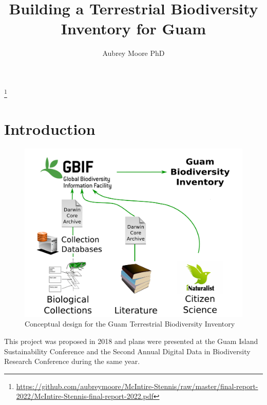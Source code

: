 \documentclass[12pt,letterpaper,english,bibliography=totocnumbered, abstract=on]{scrartcl}
\begin{document}
\titlehead{Final Report: McIntire-Stennis Project GUA0930}

\title{Building a Terrestrial Biodiversity Inventory for Guam}

\author{Aubrey Moore PhD}

\maketitle
\footnote{\url{https://github.com/aubreymoore/McIntire-Stennis/raw/master/final-report-2022/McIntire-Stennis-final-report-2022.pdf}}
\newpage
\tableofcontents





\pagebreak
\section{Introduction}
\newrefsection[my.bib]

\begin{figure}[h]
	\includegraphics[width=\linewidth]{images/diag1}
	\caption{Conceptual design for the Guam Terrestrial Biodiversity Inventory}
	\label{fig:diag1}
\end{figure}

This project was proposed in 2018 \cite{moore_mcintire-stennis_2018} and plans were presented at the Guam Island Sustainability Conference \cite{moore_building_2018} and the Second Annual Digital Data in Biodiversity Research Conference \cite{moore_building_2018-1} during the same year.
\end{document}
